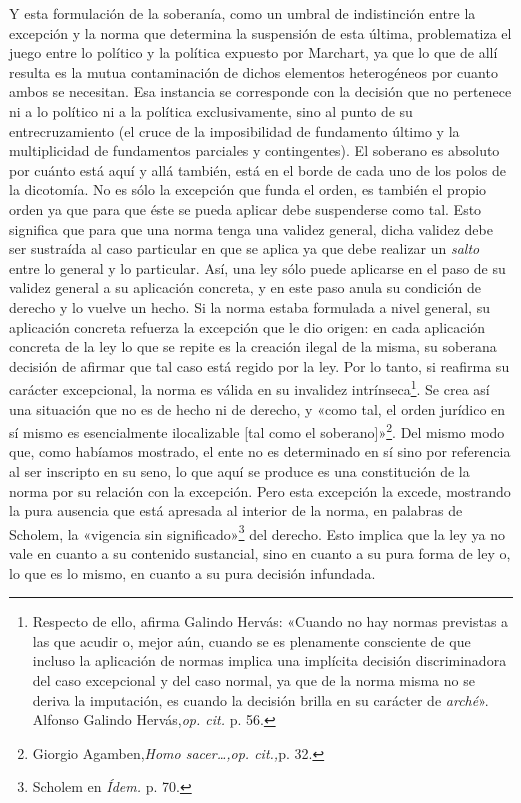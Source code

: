 Y esta formulación de la soberanía, como un umbral de indistinción entre la excepción y la norma que determina la suspensión de esta última, problematiza el juego entre lo político y la política expuesto por Marchart, ya que lo que de allí resulta es la mutua contaminación de dichos elementos heterogéneos por cuanto ambos se necesitan. Esa instancia se corresponde con la decisión que no pertenece ni a lo político ni a la política exclusivamente, sino al punto de su entrecruzamiento (el cruce de la imposibilidad de fundamento último y la multiplicidad de fundamentos parciales y contingentes). El soberano es absoluto por cuánto está aquí y allá también, está en el borde de cada uno de los polos de la dicotomía. No es sólo la excepción que funda el orden, es también el propio orden ya que para que éste se pueda aplicar debe suspenderse como tal. Esto significa que para que una norma tenga una validez general, dicha validez debe ser sustraída al caso particular en que se aplica ya que debe realizar un \emph{salto} entre lo general y lo particular. Así, una ley sólo puede aplicarse en el paso de su validez general a su aplicación concreta, y en este paso anula su condición de derecho y lo vuelve un hecho. Si la norma estaba formulada a nivel general, su aplicación concreta refuerza la excepción que le dio origen: en cada aplicación concreta de la ley lo que se repite es la creación ilegal de la misma, su soberana decisión de afirmar que tal caso está regido por la ley. Por lo tanto, si reafirma su carácter excepcional, la norma es válida en su invalidez intrínseca\footnote{Respecto de ello, afirma Galindo Hervás: «Cuando no hay normas previstas a las que acudir o, mejor aún, cuando se es plenamente consciente de que incluso la aplicación de normas implica una implícita decisión discriminadora del caso excepcional y del caso normal, ya que de la norma misma no se deriva la imputación, es cuando la decisión brilla en su carácter de \emph{arché}». Alfonso Galindo Hervás,\emph{op. cit.} p. 56.}. Se crea así una situación que no es de hecho ni de derecho, y «como tal, el orden jurídico en sí mismo es esencialmente ilocalizable {[}tal como el soberano{]}»\footnote{Giorgio Agamben,\emph{Homo sacer\ldots,op. cit.,}p. 32.}. Del mismo modo que, como habíamos mostrado, el ente no es determinado en sí sino por referencia al ser inscripto en su seno, lo que aquí se produce es una constitución de la norma por su relación con la excepción. Pero esta excepción la excede, mostrando la pura ausencia que está apresada al interior de la norma, en palabras de Scholem, la «vigencia sin significado»\footnote{Scholem en \emph{Ídem.} p. 70.} del derecho. Esto implica que la ley ya no vale en cuanto a su contenido sustancial, sino en cuanto a su pura forma de ley o, lo que es lo mismo, en cuanto a su pura decisión infundada.

